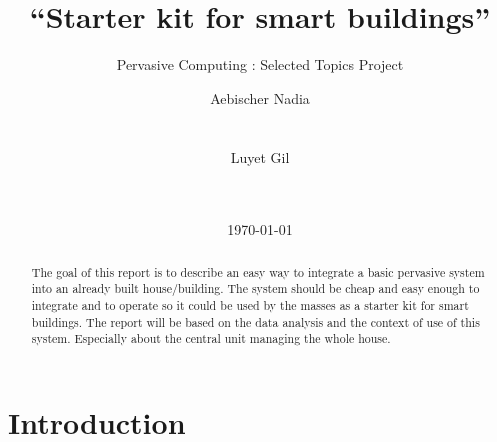 \documentclass{acm_proc_article-sp}
\begin{document}
\graphicspath{{figures/}}

\title{“Starter kit for smart buildings”}
\subtitle{Pervasive Computing : Selected Topics Project}

%
\author{
\alignauthor 
  Aebischer Nadia
  \\
  \\
  \\
\alignauthor 
  Luyet Gil
  \\
  \\
  \\
}
\date{\today}
\maketitle
\begin{abstract}
The goal of this report is to describe an easy way to integrate a basic pervasive system into an already built house/building. 
The system should be cheap and easy enough to integrate and to operate so it could be used by the masses as a starter kit for smart buildings. 
The report will be based on the data analysis and the context of use of this system. 
Especially about the central unit managing the whole house.
\end{abstract}
\section{Introduction}
\end{document}
